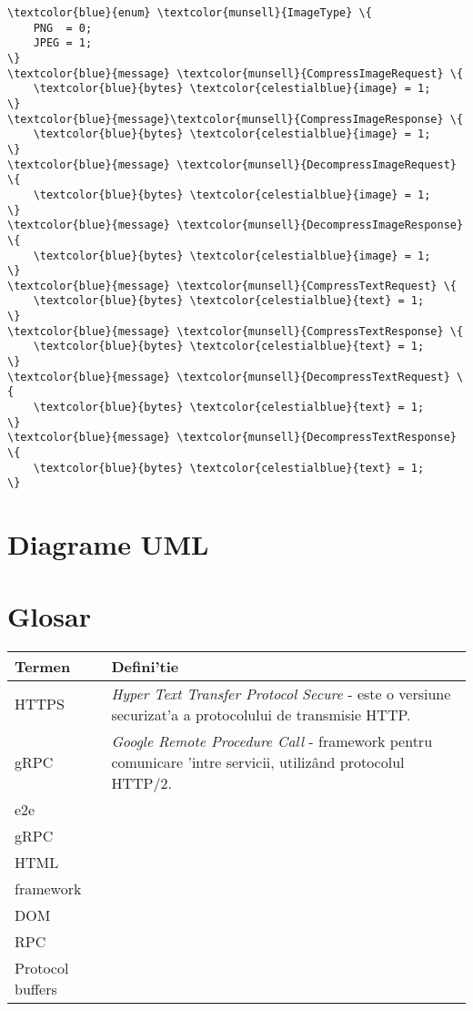 \begin{tcolorbox}
{\begin{Verbatim}[commandchars=\\\{\}]
\textcolor{blue}{enum} \textcolor{munsell}{ImageType} \{
	PNG  = 0;
	JPEG = 1;
\}
\textcolor{blue}{message} \textcolor{munsell}{CompressImageRequest} \{
    \textcolor{blue}{bytes} \textcolor{celestialblue}{image} = 1;
\}
\textcolor{blue}{message}\textcolor{munsell}{CompressImageResponse} \{
    \textcolor{blue}{bytes} \textcolor{celestialblue}{image} = 1;
\}
\textcolor{blue}{message} \textcolor{munsell}{DecompressImageRequest} \{
    \textcolor{blue}{bytes} \textcolor{celestialblue}{image} = 1;
\}
\textcolor{blue}{message} \textcolor{munsell}{DecompressImageResponse} \{
    \textcolor{blue}{bytes} \textcolor{celestialblue}{image} = 1;
\}
\textcolor{blue}{message} \textcolor{munsell}{CompressTextRequest} \{
    \textcolor{blue}{bytes} \textcolor{celestialblue}{text} = 1;
\}
\textcolor{blue}{message} \textcolor{munsell}{CompressTextResponse} \{
    \textcolor{blue}{bytes} \textcolor{celestialblue}{text} = 1;
\}
\textcolor{blue}{message} \textcolor{munsell}{DecompressTextRequest} \{
    \textcolor{blue}{bytes} \textcolor{celestialblue}{text} = 1;
\}
\textcolor{blue}{message} \textcolor{munsell}{DecompressTextResponse} \{
    \textcolor{blue}{bytes} \textcolor{celestialblue}{text} = 1;
\}

\end{Verbatim}
}
\end{tcolorbox}


\listoffigures

\listoftables

\chapter{Diagrame UML}

\chapter{Glosar}
\begin{center}
\begin{table}[H]
\centering
\begin{tabu} to 0.8\textwidth { | X[c] | X[c] |  }
 \hline
 Termen     & Defini'tie\\
 \hline
 HTTPS   & \textit{Hyper Text Transfer Protocol Secure} - este o versiune securizat'a a protocolului de transmisie HTTP.  \\
 \hline
 gRPC &  \textit{Google Remote Procedure Call} - framework pentru comunicare 'intre servicii, utilizând protocolul HTTP/2. \\
 \hline
  e2e &  \\
  gRPC &  \\
 HTML &  \\
 framework  &  \\
 DOM &  \\
  RPC &  \\
  Protocol buffers &  \\
 \hline
 
\end{tabu}
\end{table}
\end{center}
